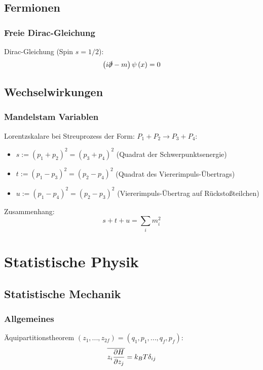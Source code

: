 \documentclass[11pt]{article}
\numberwithin{equation}{section}
\begin{document}
		\subsection{Fermionen}
			\subsubsection{Freie Dirac-Gleichung}
				\noindent
				Dirac-Gleichung (Spin $s=1/2$):
				\begin{equation}
					\left(  i\slashed{\partial} - m  \right) \psi\left( x \right) = 0
				\end{equation}





		\subsection{Wechselwirkungen}
			\subsubsection{Mandelstam Variablen}
				\noindent
				Lorentzskalare bei Streuprozess der Form: $P_1 + P_2 \rightarrow P_3 + P_4$:
				\begin{itemize}\itemsep -0pt	%
					\item $s:=(p_1+p_2)^2=(p_3+p_4)^2$ \hfill{(Quadrat der Schwerpunktsenergie)}
					\item $t:=(p_1-p_3)^2=(p_2-p_4)^2$ \hfill{(Quadrat des Viererimpuls-Übertrags)}
					\item $u:=(p_1-p_4)^2=(p_2-p_3)^2$ \hfill{(Viererimpuls-Übertrag auf Rückstoßteilchen)}
				\end{itemize}

				\noindent
				Zusammenhang:
				\begin{equation}
					s+t+u = \sum_i m_i^2
				\end{equation}




	\newpage
	\section{Statistische Physik}
		\subsection{Statistische Mechanik}
			\subsubsection{Allgemeines}
				\noindent
				Äquipartitionstheorem $(z_1,...,z_{2f}) = (q_1, p_1, ..., q_f, p_f)$:
				\begin{equation}
					\overline{ z_i \frac{\partial H}{\partial z_j}} = k_B T \delta_{ij}
				\end{equation}
\end{document}
